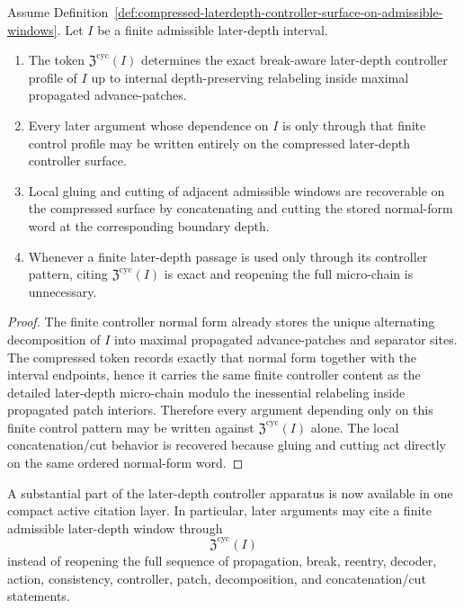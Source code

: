 \begin{proposition}
\label{prop:exact-finite-control-recovery-from-the-compressed-laterdepth-controller-surface}
Assume Definition~\ref{def:compressed-laterdepth-controller-surface-on-admissible-windows}. Let $I$ be a finite admissible later-depth interval.
\begin{enumerate}[leftmargin=2em,label=\textup{(\roman*)}]
 \item The token $\mathfrak Z^{\mathrm{cyc}}(I)$ determines the exact break-aware later-depth controller profile of $I$ up to internal depth-preserving relabeling inside maximal propagated advance-patches.
 \item Every later argument whose dependence on $I$ is only through that finite control profile may be written entirely on the compressed later-depth controller surface.
 \item Local gluing and cutting of adjacent admissible windows are recoverable on the compressed surface by concatenating and cutting the stored normal-form word at the corresponding boundary depth.
 \item Whenever a finite later-depth passage is used only through its controller pattern, citing $\mathfrak Z^{\mathrm{cyc}}(I)$ is exact and reopening the full micro-chain is unnecessary.
\end{enumerate}
\end{proposition}

\begin{proof}
The finite controller normal form already stores the unique alternating decomposition of $I$ into maximal propagated advance-patches and separator sites. The compressed token records exactly that normal form together with the interval endpoints, hence it carries the same finite controller content as the detailed later-depth micro-chain modulo the inessential relabeling inside propagated patch interiors. Therefore every argument depending only on this finite control pattern may be written against $\mathfrak Z^{\mathrm{cyc}}(I)$ alone. The local concatenation/cut behavior is recovered because gluing and cutting act directly on the same ordered normal-form word.
\end{proof}

\begin{corollary}
\label{cor:what-the-compressed-laterdepth-controller-surface-already-buys-on-the-active-line}
A substantial part of the later-depth controller apparatus is now available in one compact active citation layer. In particular, later arguments may cite a finite admissible later-depth window through
\[
\mathfrak Z^{\mathrm{cyc}}(I)
\]
instead of reopening the full sequence of propagation, break, reentry, decoder, action, consistency, controller, patch, decomposition, and concatenation/cut statements.
\end{corollary}

